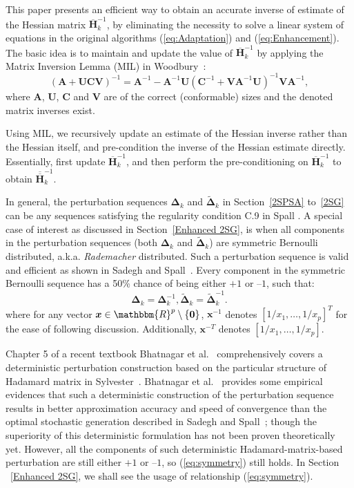\documentclass[conference,10.3cpt]{IEEEtran}
\newcommand{\bDelta}{\bm{\Delta}}
\newcommand{\oH}{\bm{\overline{H}}}
\newcommand{\ooH}{\bm{\overline{\overline{H}}}}
\newcommand{\tDelta}{\bm{\tilde{\Delta}}}
\begin{document}
This paper presents an efficient way to obtain an accurate inverse of
estimate of the Hessian matrix $\oH_k^{-1}$, by eliminating the necessity to solve a
linear system of equations in the original algorithms (\ref{eq:Adaptation}) and (\ref{eq:Enhancement}). The basic idea is to maintain and update the
value of $\oH_k^{-1}$ by applying the Matrix Inversion Lemma (MIL) in Woodbury~\cite{Woodbury1950}:
\begin{equation}
\label{eq:MatrixInversion}
(\bm{A}+\bm{UCV})^{-1}=\bm{A}^{-1}-\bm{A}^{-1}\bm{U}(\bm{C}^{-1}+\bm{V}\bm{A}^{-1}\bm{U})^{-1}\bm{V}\bm{A}^{-1},
\end{equation}
where $\bm{A}$, $\bm{U}$, $\bm{C}$ and $\bm{V}$
are of the correct (conformable) sizes and the denoted matrix inverses
exist.

Using MIL, we recursively update an estimate of the
Hessian inverse rather than the Hessian itself, and
pre-condition the inverse of the Hessian estimate directly. Essentially, first update $ \oH_k^{-1} $, and then
perform the pre-conditioning on $ \oH_k^{-1} $ to obtain $\ooH_k^{-1}$.

In general, the perturbation sequences $\bDelta_k$ and
$\tDelta_k$ in Section~\ref{2SPSA} to~\ref{2SG} can be any sequences
satisfying the regularity condition C.9 in Spall
\cite{Spall2009}. A special case of interest as discussed in
Section~\ref{Enhanced 2SG}, is when
all components in the perturbation sequences (both $ \bDelta_k $ and
$\tDelta_k $) are symmetric Bernoulli distributed,
a.k.a. \textit{Rademacher} distributed. Such a perturbation sequence
is valid and efficient as shown in Sadegh and Spall~\cite{Sadegh1998}. Every component in the symmetric Bernoulli sequence has a 50\% chance of being either $+1$ or
$\text{--}1$, such that:
\begin{equation} \label{eq:symmetry}
\bDelta_k=\bDelta_k^{-1}, \tDelta_k=\tDelta_k^{-1}.
\end{equation}
where for any vector
$ \bm{x}\in \mathbbm{R}^p \setminus \{\bm{0}\} $, 
$\bm{x}^{-1}$ denotes $[1/x_1, \ldots, 1/x_p]^T$ for the ease of following discussion. Additionally, $ \bm{x}^{-T} $ denotes $[1/x_1, \ldots, 1/x_p]$.

Chapter 5 of a recent textbook Bhatnagar et al.~\cite{Bhatnagar2012} comprehensively covers a deterministic perturbation construction based on the particular structure of Hadamard matrix in Sylvester~\cite{Sylvester1867}. Bhatnagar et al.~\cite{Bhatnagar2003} provides some empirical evidences that such a deterministic construction of the
perturbation sequence results in better approximation
accuracy and speed of convergence than the optimal stochastic
generation described in Sadegh and Spall~\cite{Sadegh1998}; though
the superiority of this deterministic formulation has not been proven theoretically yet. However, all the components of
such deterministic
Hadamard-matrix-based perturbation are still either $+1$ or $\text{--}1$,
so (\ref{eq:symmetry}) still holds. In Section ~\ref{Enhanced 2SG}, we shall see the usage of relationship (\ref{eq:symmetry}).
\end{document}
